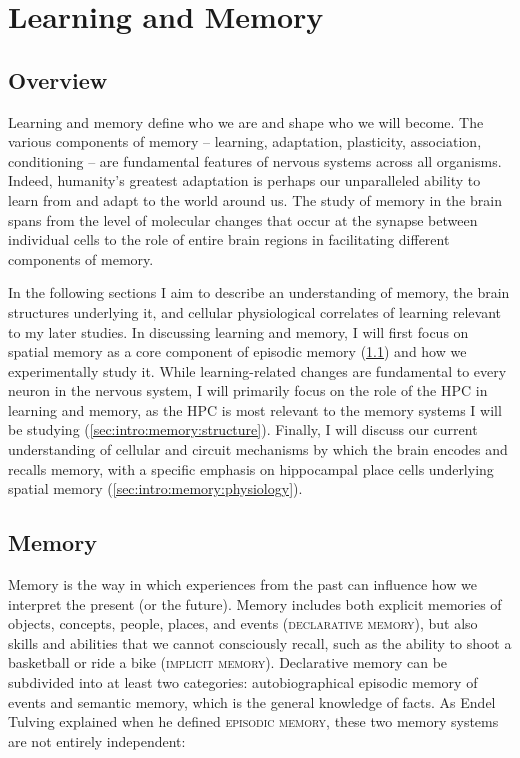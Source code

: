 \acresetall
\chapter{Learning and Memory}
\label{ch:intro:memory}
\section*{Overview}
Learning and memory define who we are and shape who we will become.
The various components of memory -- learning, adaptation, plasticity, association, conditioning -- are fundamental features of nervous systems across all organisms.
Indeed, humanity's greatest adaptation is perhaps our unparalleled ability to learn from and adapt to the world around us.
The study of memory in the brain spans from the level of molecular changes that occur at the synapse between individual cells to the role of entire brain regions in facilitating different components of memory.

In the following sections I aim to describe an understanding of memory, the brain structures underlying it, and cellular physiological correlates of learning relevant to my later studies.
In discussing learning and memory, I will first focus on spatial memory as a core component of episodic memory (\ref{sec:intro:memory:memory}) and how we experimentally study it.
While learning-related changes are fundamental to every neuron in the nervous system, I will primarily focus on the role of the \ac{HPC} in learning and memory, as the \ac{HPC} is most relevant to the memory systems I will be studying (\ref{sec:intro:memory:structure}).
Finally, I will discuss our current understanding of cellular and circuit mechanisms by which the brain encodes and recalls memory, with a specific emphasis on hippocampal place cells underlying spatial memory (\ref{sec:intro:memory:physiology}).

\section{Memory}\label{sec:intro:memory:memory}
Memory is the way in which experiences from the past can influence how we interpret the present (or the future).
Memory includes both explicit memories of objects, concepts, people, places, and events (\textsc{declarative memory}), but also skills and abilities that we cannot consciously recall, such as the ability to shoot a basketball or ride a bike (\textsc{implicit memory}).
Declarative memory can be subdivided into at least two categories: autobiographical episodic memory of events and semantic memory, which is the general knowledge of facts.
As Endel Tulving explained when he defined \textsc{episodic memory}, these two memory systems are not entirely independent:

